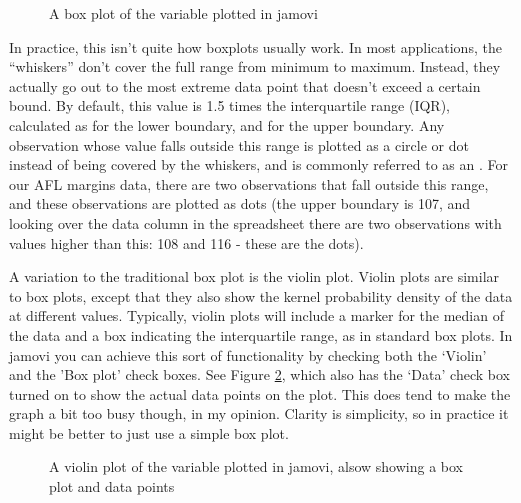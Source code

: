 \begin{figure}[h]
\begin{center}
\caption{A box plot of the  variable plotted in jamovi}
\label{fig:boxplot1}
\HR
\end{center}
\end{figure}

In practice, this isn't quite how boxplots usually work. In most applications, the ``whiskers'' don't cover the full range from minimum to maximum. Instead, they actually go out to the most extreme data point that doesn't exceed a certain bound. By default, this value is 1.5 times the interquartile range (IQR), calculated as  for the lower boundary, and  for the upper boundary. Any observation whose value falls outside this range is plotted as a circle or dot instead of being covered by the whiskers, and is commonly referred to as an . For our AFL margins data, there are two observations that fall outside this range, and these observations are plotted as dots (the upper boundary is 107, and looking over the data column in the spreadsheet there are two observations with values higher than this: 108 and 116 - these are the dots). 



A variation to the traditional box plot is the violin plot. Violin plots are similar to box plots, except that they also show the kernel probability density of the data at different values. Typically, violin plots will include a marker for the median of the data and a box indicating the interquartile range, as in standard box plots. In jamovi you can achieve this sort of functionality by checking both the `Violin' and the 'Box plot' check boxes. See Figure \ref{fig:boxplot2}, which also has the `Data' check box turned on to show the actual data points on the plot. This does tend to make the graph a bit too busy though, in my opinion. Clarity is simplicity, so in practice it might be better to just use a simple box plot.


\begin{figure}[h]
\begin{center}
\caption{A violin plot of the  variable plotted in jamovi, alsow showing a box plot and data points}
\label{fig:boxplot2}
\HR
\end{center}
\end{figure}



